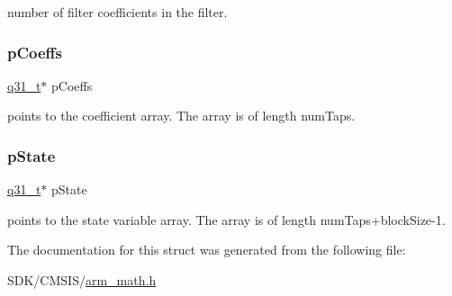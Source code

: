number of filter coefficients in the filter. \mbox{\label{structarm__fir__instance__q31_a68888e36167d81cb7836db10367a1682}} 
\subsubsection{\texorpdfstring{p\+Coeffs}{pCoeffs}}
{\footnotesize\ttfamily \mbox{\hyperlink{arm__math_8h_adc89a3547f5324b7b3b95adec3806bc0}{q31\+\_\+t}}$\ast$ p\+Coeffs}

points to the coefficient array. The array is of length num\+Taps. \mbox{\label{structarm__fir__instance__q31_adee4ba3ee8869865af7d8fa08ca913d6}} 
\subsubsection{\texorpdfstring{p\+State}{pState}}
{\footnotesize\ttfamily \mbox{\hyperlink{arm__math_8h_adc89a3547f5324b7b3b95adec3806bc0}{q31\+\_\+t}}$\ast$ p\+State}

points to the state variable array. The array is of length num\+Taps+block\+Size-\/1. 

The documentation for this struct was generated from the following file\+:\begin{DoxyCompactItemize}
\item 
S\+D\+K/\+C\+M\+S\+I\+S/\mbox{\hyperlink{arm__math_8h}{arm\+\_\+math.\+h}}\end{DoxyCompactItemize}
